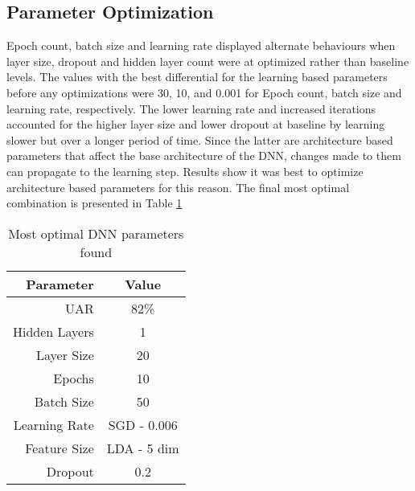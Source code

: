 	 \subsection{Parameter Optimization}
	Epoch count, batch size and learning rate displayed alternate behaviours when layer size, dropout and hidden layer count were at optimized rather than baseline levels. The values with the best differential for the learning based parameters before any optimizations were 30, 10, and 0.001 for Epoch count, batch size and learning rate, respectively. The lower learning rate and increased iterations accounted for the higher layer size and lower dropout at baseline by learning slower but over a longer period of time. Since the latter are architecture based parameters that affect the base architecture of the DNN, changes made to them can propagate to the learning step. Results show it was best to optimize architecture based parameters for this reason. The final most optimal combination is presented in Table \ref{final}
	 \begin{table}[!hbt]
	 	\centering
	 	\caption{Most optimal DNN parameters found}
	 	\begin{tabular}{|r|c|}
	 		\hline
	 		Parameter     & Value       \\ \hline
	 		UAR           & 82\%        \\ \hline
	 		Hidden Layers & 1           \\ \hline
	 		Layer Size    & 20          \\ \hline
	 		Epochs        & 10          \\ \hline
	 		Batch Size    & 50          \\ \hline
	 		Learning Rate & SGD - 0.006 \\ \hline
	 		Feature Size  & LDA - 5 dim \\ \hline
	 		Dropout       & 0.2         \\ \hline
	 	\end{tabular}
 	\label{final}
	 \end{table}